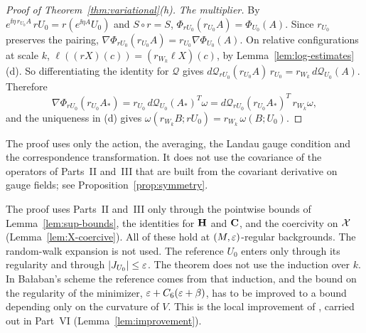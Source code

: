 \begin{proof}[Proof of Theorem~\ref{thm:variational}(h)]
\emph{The multiplier.} By $e^{\ii\eta\,r_{U_0}A}\,rU_0=r(e^{\ii\eta A}U_0)$ and $S\circ r=S$, $\Phi_{rU_0}(r_{U_0}A)=\Phi_{U_0}(A)$. Since $r_{U_0}$ preserves the pairing, $\nabla\Phi_{rU_0}(r_{U_0}A)=r_{U_0}\nabla\Phi_{U_0}(A)$. On relative configurations at scale $k$, $\ell((rX)(c))=(r_{W_k}\ell X)(c)$, by Lemma~\ref{lem:log-estimates}(d). So differentiating the identity for $\mathcal Q$ gives $d\mathcal Q_{rU_0}(r_{U_0}A)\,r_{U_0}=r_{W_k}\,d\mathcal Q_{U_0}(A)$. Therefore
\[
\nabla\Phi_{rU_0}(r_{U_0}A_*)=r_{U_0}\,d\mathcal Q_{U_0}(A_*)^T\omega=d\mathcal Q_{rU_0}(r_{U_0}A_*)^T\,r_{W_k}\omega ,
\]
and the uniqueness in (d) gives $\omega(r_{W_k}B;rU_0)=r_{W_k}\,\omega(B;U_0)$.
\end{proof}

The proof uses only the action, the averaging, the Landau gauge condition and the correspondence transformation. It does not use the covariance of the operators of Parts~II and~III that are built from the covariant derivative on gauge fields; see Proposition~\ref{prop:symmetry}.

\begin{remark}\label{x:27.6}
The proof uses Parts~II and~III only through the pointwise bounds of Lemma~\ref{lem:sup-bounds}, the identities for $\mathbf H$ and $\mathbf C$, and the coercivity on $\mathcal X$ (Lemma~\ref{lem:X-coercive}). All of these hold at $(M,\varepsilon)$-regular backgrounds. The random-walk expansion is not used. The reference $U_0$ enters only through its regularity and through $|J_{U_0}|\le\varepsilon$. The theorem does not use the induction over $k$. In Ba\l aban's scheme the reference comes from that induction, and the bound on the regularity of the minimizer, $\varepsilon+C_6(\varepsilon+\beta)$, has to be improved to a bound depending only on the curvature of $V$. This is the local improvement of \cite[Sect.~F]{BalVar}, carried out in Part~VI (Lemma~\ref{lem:improvement}).
\end{remark}
